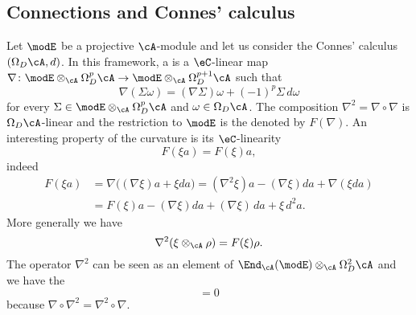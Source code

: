 \subsection{Connections and Connes' calculus}

Let $\modE$ be a projective $\cA$-module and let us consider the Connes' calculus $(\Omega_D\cA,d)$. In this framework, a  is a $\eC$-linear map $\nabla\colon \modE\otimes_{\cA}\Omega_D^p\cA\to \modE\otimes_{\cA}\Omega^{p+1}_D\cA$ such that
\begin{equation}
	\nabla(\Sigma\omega)=(\nabla\Sigma)\omega+(-1)^p\Sigma\,d\omega
\end{equation}
for every $\Sigma\in\modE\otimes_{\cA}\Omega^p_D\cA$ and $\omega\in\Omega_D\cA$. The composition $\nabla^2=\nabla\circ\nabla$ is $\Omega_D\cA$-linear and the restriction to $\modE$ is the  denoted by $F(\nabla)$. An interesting property of the curvature is its $\eC$-linearity
\begin{equation}
	F(\xi a)=F(\xi)a,
\end{equation}
indeed
\begin{align*}
	F(\xi a) & =\nabla\big( (\nabla\xi)a+\xi da \big)=(\nabla^2\xi)a-(\nabla\xi)da+\nabla(\xi da) \\
	         & =F(\xi)a-(\nabla\xi)da+(\nabla\xi)\,da+\xi\,d^2a.
\end{align*}
More generally we have
\begin{equation}
	\nabla^2(\xi\otimes_{\cA}\rho)=F(\xi)\rho.
\end{equation}
The operator $\nabla^2$ can be seen as an element of $\End_{\cA}(\modE)\otimes_{\cA}\Omega^2_D\cA$ and we have the 
\begin{equation}
	[\nabla,F]=0
\end{equation}
because $\nabla\circ\nabla^2=\nabla^2\circ\nabla$.

